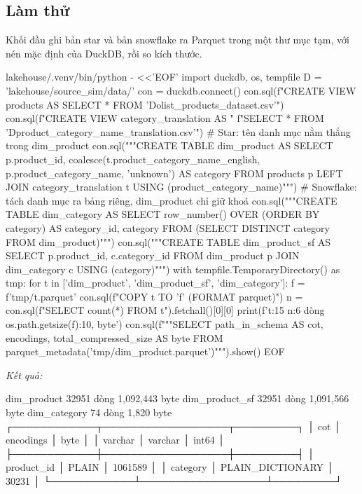 \subsection{Làm thử}

Khối đầu ghi bản star và bản snowflake ra Parquet trong một thư mục tạm, với nén mặc định của DuckDB, rồi so kích thước.

\begin{codeblock}
lakehouse/.venv/bin/python - <<'EOF'
import duckdb, os, tempfile
D = 'lakehouse/source_sim/data/'
con = duckdb.connect()
con.sql(f"CREATE VIEW products AS SELECT * FROM '{D}olist_products_dataset.csv'")
con.sql(f"CREATE VIEW category_translation AS "
        f"SELECT * FROM '{D}product_category_name_translation.csv'")
# Star: tên danh mục nằm thẳng trong dim_product
con.sql("""CREATE TABLE dim_product AS
  SELECT p.product_id, coalesce(t.product_category_name_english,
                                p.product_category_name, 'unknown') AS category
  FROM products p LEFT JOIN category_translation t USING (product_category_name)""")
# Snowflake: tách danh mục ra bảng riêng, dim_product chỉ giữ khoá
con.sql("""CREATE TABLE dim_category AS
  SELECT row_number() OVER (ORDER BY category) AS category_id, category
  FROM (SELECT DISTINCT category FROM dim_product)""")
con.sql("""CREATE TABLE dim_product_sf AS
  SELECT p.product_id, c.category_id
  FROM dim_product p JOIN dim_category c USING (category)""")
with tempfile.TemporaryDirectory() as tmp:
    for t in ['dim_product', 'dim_product_sf', 'dim_category']:
        f = f'{tmp}/{t}.parquet'
        con.sql(f"COPY {t} TO '{f}' (FORMAT parquet)")
        n = con.sql(f"SELECT count(*) FROM {t}").fetchall()[0][0]
        print(f'{t:15} {n:6} dòng {os.path.getsize(f):10,} byte')
    con.sql(f"""SELECT path_in_schema AS cot, encodings,
                       total_compressed_size AS byte
                FROM parquet_metadata('{tmp}/dim_product.parquet')""").show()
EOF
\end{codeblock}
\textit{Kết quả:}
\begin{codeblock}
dim_product      32951 dòng  1,092,443 byte
dim_product_sf   32951 dòng  1,091,566 byte
dim_category        74 dòng      1,820 byte
┌────────────┬──────────────────┬─────────┐
│    cot     │    encodings     │  byte   │
│  varchar   │     varchar      │  int64  │
├────────────┼──────────────────┼─────────┤
│ product_id │ PLAIN            │ 1061589 │
│ category   │ PLAIN_DICTIONARY │   30231 │
└────────────┴──────────────────┴─────────┘
\end{codeblock}

